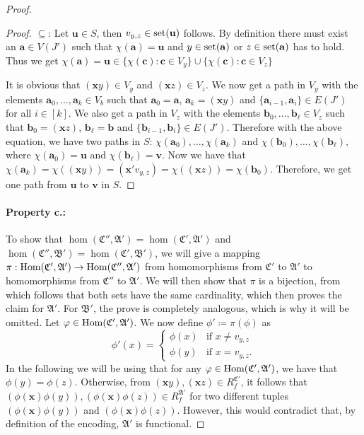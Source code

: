 \begin{proof}
\begin{proof}
		$\subseteq$:
		Let $\mathbf u\in S$, then $v_{y,z}\in \operatorname{set}(\mathbf u)$ follows.
		By definition there must exist an $\mathbf a \in V(J')$ such that $\chi(\mathbf a)=\mathbf u$ and $y\in \operatorname{set}(\mathbf a)$ or $z\in \operatorname{set}(\mathbf a)$ has to hold.
		Thus we get $\chi(\mathbf a)=\mathbf u\in \{\chi(\mathbf c) : \mathbf c\in V_y\}\cup \{\chi(\mathbf c) : \mathbf c\in V_z\}$
		
		It is obvious that $(\mathbf xy)\in V_y$ and $(\mathbf xz)\in V_z$.
		We now get a path in $V_y$ with the elements $\mathbf a_0,\dots,\mathbf a_k\in V_b$ such that $\mathbf a_0=\mathbf a$, $\mathbf a_k=(\mathbf xy)$ and $\{\mathbf a_{i-1},\mathbf a_i\}\in E(J')$ for all $i\in [k]$.
		We also get a path in $V_z$ with the elements $\mathbf b_0,\dots,\mathbf b_\ell\in V_z$ such that $\mathbf b_0=(\mathbf xz)$, $\mathbf b_\ell = \mathbf b$ and $\{\mathbf b_{i-1},\mathbf b_i\}\in E(J')$.
		Therefore with the above equation, we have two paths in $S$: $\chi(\mathbf a_0),\dots,\chi(\mathbf a_k)$ and $\chi(\mathbf b_0),\dots,\chi(\mathbf b_\ell)$, where $\chi(\mathbf a_0)=\mathbf u$ and $\chi(\mathbf b_\ell)=\mathbf v$.
		Now we have that $\chi(\mathbf a_k)=\chi((\mathbf xy))=(\mathbf x'v_{y,z})=\chi((\mathbf xz))=\chi(\mathbf b_0)$.
		Therefore, we get one path from $\mathbf u$ to $\mathbf v$ in $S$.
	\end{proof}
	
	\paragraph{Property c.:}
	To show that $\hom(\mathfrak C'',\mathfrak A')=\hom(\mathfrak C',\mathfrak A')$ and $\hom(\mathfrak C'',\mathfrak B')=\hom(\mathfrak C',\mathfrak B')$, we will give a mapping $\pi : \operatorname{Hom}(\mathfrak C',\mathfrak A')\to\operatorname{Hom}(\mathfrak C'',\mathfrak A')$ from homomorphisms from $\mathfrak C'$ to $\mathfrak A'$ to homomorphisms from $\mathfrak C''$ to $\mathfrak A'$.
	We will then show that $\pi$ is a bijection, from which follows that both sets have the same cardinality, which then proves the claim for $\mathfrak A'$.
	For $\mathfrak B'$, the prove is completely analogous, which is why it will be omitted.
	Let $\varphi\in \operatorname{Hom}(\mathfrak C',\mathfrak A')$.
	We now define $\phi'\coloneqq \pi(\phi)$ as
	$$
	\phi'(x)=
	\begin{cases}
		\phi(x) & \text{if } x\neq v_{y,z} \\
		\phi(y) & \text{if } x = v_{y,z}.
	\end{cases}
	$$
	In the following we will be using that for any $\varphi\in\operatorname{Hom}(\mathfrak C',\mathfrak A')$, we have that $\phi(y)=\phi(z)$.
	Otherwise, from $(\mathbf xy),(\mathbf xz)\in R_f^{\mathfrak C'}$, it follows that $(\phi(\mathbf x)\phi(y)),(\phi(\mathbf x)\phi(z))\in R_f^{\mathfrak A'}$ for two different tuples $(\phi(\mathbf x)\phi(y))$ and $(\phi(\mathbf x)\phi(z))$.
	However, this would contradict that, by definition of the encoding, $\mathfrak A'$ is functional.
	

\end{proof}

